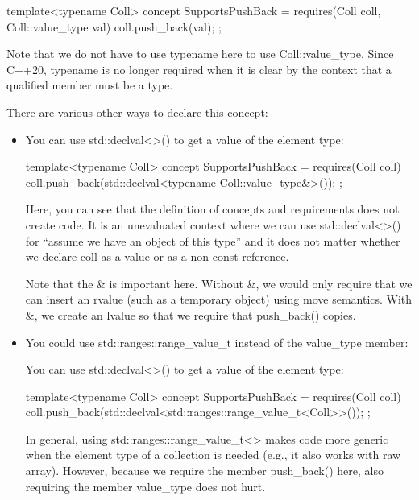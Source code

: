 \begin{cpp}
template<typename Coll>
concept SupportsPushBack = requires(Coll coll, Coll::value_type val) {
	coll.push_back(val);
};
\end{cpp}

Note that we do not have to use typename here to use Coll::value\_type. Since C++20, typename is no longer required when it is clear by the context that a qualified member must be a type.

There are various other ways to declare this concept:

\begin{itemize}
\item
You can use std::declval<>() to get a value of the element type:

\begin{cpp}
template<typename Coll>
concept SupportsPushBack = requires(Coll coll) {
	coll.push_back(std::declval<typename Coll::value_type&>());
};
\end{cpp}

Here, you can see that the definition of concepts and requirements does not create code. It is an unevaluated context where we can use std::declval<>() for “assume we have an object of this type” and it does not matter whether we declare coll as a value or as a non-const reference.

Note that the \& is important here. Without \&, we would only require that we can insert an rvalue (such as a temporary object) using move semantics. With \&, we create an lvalue so that we require that push\_back() copies.

\item
You could use std::ranges::range\_value\_t instead of the value\_type member:

You can use std::declval<>() to get a value of the element type:

\begin{cpp}
template<typename Coll>
concept SupportsPushBack = requires(Coll coll) {
	coll.push_back(std::declval<std::ranges::range_value_t<Coll>>());
};
\end{cpp}

In general, using std::ranges::range\_value\_t<> makes code more generic when the element type of a collection is needed (e.g., it also works with raw array). However, because we require the member push\_back() here, also requiring the member value\_type does not hurt.

\end{itemize}

